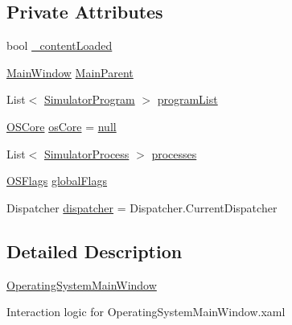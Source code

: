 \subsection*{Private Attributes}
\begin{DoxyCompactItemize}
\item 
bool \hyperlink{class_c_p_u___o_s___simulator_1_1_operating_system_main_window_a824bac181aa4f034115dfac40c744738}{\+\_\+content\+Loaded}
\item 
\hyperlink{class_c_p_u___o_s___simulator_1_1_main_window}{Main\+Window} \hyperlink{class_c_p_u___o_s___simulator_1_1_operating_system_main_window_ac8fb17a148ca5015223b520c35aaf854}{Main\+Parent}
\item 
List$<$ \hyperlink{class_c_p_u___o_s___simulator_1_1_c_p_u_1_1_simulator_program}{Simulator\+Program} $>$ \hyperlink{class_c_p_u___o_s___simulator_1_1_operating_system_main_window_a83bef5323931616842c44d3f8d477fd2}{program\+List}
\item 
\hyperlink{class_c_p_u___o_s___simulator_1_1_operating___system_1_1_o_s_core}{O\+S\+Core} \hyperlink{class_c_p_u___o_s___simulator_1_1_operating_system_main_window_af944b743b4780850089320d08d38b0ed}{os\+Core} = \hyperlink{_old_01_process_01_flags_8cs_afb8e110345c45e74478894341ab6b28e}{null}
\item 
List$<$ \hyperlink{class_c_p_u___o_s___simulator_1_1_operating___system_1_1_simulator_process}{Simulator\+Process} $>$ \hyperlink{class_c_p_u___o_s___simulator_1_1_operating_system_main_window_ab6bcbc8c33ec438d2f005d4c978e1a44}{processes}
\item 
\hyperlink{struct_c_p_u___o_s___simulator_1_1_operating___system_1_1_o_s_flags}{O\+S\+Flags} \hyperlink{class_c_p_u___o_s___simulator_1_1_operating_system_main_window_a905f81a88e7878e936352f6da9ffcb93}{global\+Flags}
\item 
Dispatcher \hyperlink{class_c_p_u___o_s___simulator_1_1_operating_system_main_window_ac0f8e9dfcaba558927c53e11815fb0fb}{dispatcher} = Dispatcher.\+Current\+Dispatcher
\end{DoxyCompactItemize}


\subsection{Detailed Description}
\hyperlink{class_c_p_u___o_s___simulator_1_1_operating_system_main_window}{Operating\+System\+Main\+Window} 

Interaction logic for Operating\+System\+Main\+Window.\+xaml 

